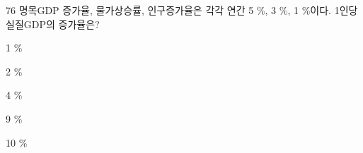 \begin{question}{76}
명목GDP 증가율, 물가상승률, 인구증가율은 각각 연간 5 \%, 3 \%, 1 \%이다. 1인당 실질GDP의 증가율은?
\begin{choices}
  \item 1 \%
  \item 2 \%
  \item 4 \%
  \item 9 \%
  \item 10 \%
\end{choices}
\end{question}
